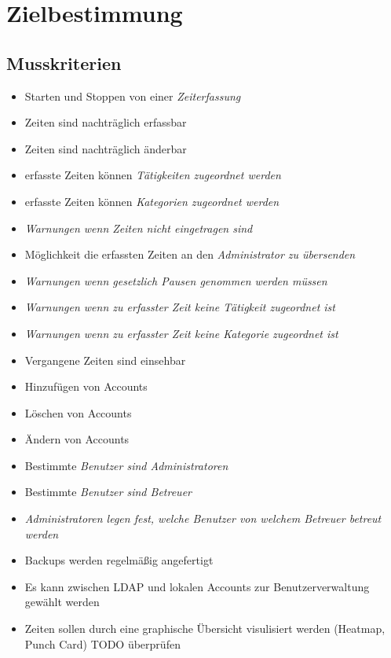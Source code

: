 \section{Zielbestimmung}

\subsection{Musskriterien}

\begin{itemize}
	\item Starten und Stoppen von einer \em{Zeiterfassung}
	\item Zeiten sind nachträglich erfassbar
	\item Zeiten sind nachträglich änderbar
	\item erfasste Zeiten können \em{Tätigkeiten} zugeordnet werden
	\item erfasste Zeiten können \em{Kategorien} zugeordnet werden
	\item \em{Warnungen} wenn Zeiten nicht eingetragen sind
	\item Möglichkeit die erfassten Zeiten an den \em{Administrator} zu übersenden
	\item \em{Warnungen} wenn gesetzlich Pausen genommen werden müssen
	\item \em{Warnungen} wenn zu erfasster Zeit keine \em{Tätigkeit} zugeordnet ist
	\item \em{Warnungen} wenn zu erfasster Zeit keine \em{Kategorie} zugeordnet ist
	\item Vergangene Zeiten sind einsehbar
	\item Hinzufügen von Accounts
	\item Löschen von Accounts
	\item Ändern von Accounts
	\item Bestimmte \em{Benutzer} sind \em{Administratoren}
	\item Bestimmte \em{Benutzer} sind \em{Betreuer}
	\item \em{Administratoren} legen fest, welche \em{Benutzer} von welchem \em{Betreuer} betreut werden
	\item Backups werden regelmäßig angefertigt
	\item Es kann zwischen LDAP und lokalen Accounts zur Benutzerverwaltung gewählt werden
	\item Zeiten sollen durch eine graphische Übersicht visulisiert werden (Heatmap, Punch Card) TODO überprüfen
\end{itemize}



